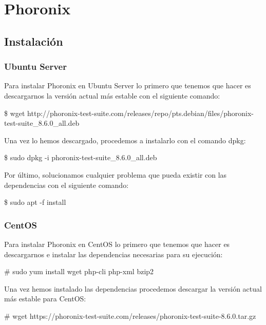 \newpage %

\tableofcontents %
\listoffigures %

\newpage
\section{Phoronix}
\subsection{Instalación}
\subsubsection{Ubuntu Server}
Para instalar Phoronix en Ubuntu Server lo primero que tenemos que hacer es descargarnos la versión actual más estable con el siguiente comando:
\begin{tcolorbox}[colback=black!10, halign=left]
    \$ wget http://phoronix-test-suite.com/releases/repo/pts.debian/files/phoronix-test-suite\_8.6.0\_all.deb
\end{tcolorbox}

Una vez lo hemos descargado, procedemos a instalarlo con el comando dpkg:
\begin{tcolorbox}[colback=black!10, halign=left]
    \$ sudo dpkg -i phoronix-test-suite\_8.6.0\_all.deb
\end{tcolorbox}

Por último, solucionamos cualquier problema que pueda existir con las dependencias con el siguiente comando:
\begin{tcolorbox}[colback=black!10, halign=left]
    \$ sudo apt -f install
\end{tcolorbox}

\subsubsection{CentOS}
Para instalar Phoronix en CentOS lo primero que tenemos que hacer es descargarnos e instalar las dependencias necesarias para su ejecución:
\begin{tcolorbox}[colback=black!10, halign=left]
    \# sudo yum install wget php-cli php-xml bzip2
\end{tcolorbox}

Una vez hemos instalado las dependencias procedemos descargar la versión actual más estable para CentOS:
\begin{tcolorbox}[colback=black!10, halign=left]
    \# wget https://phoronix-test-suite.com/releases/phoronix-test-suite-8.6.0.tar.gz
\end{tcolorbox}


